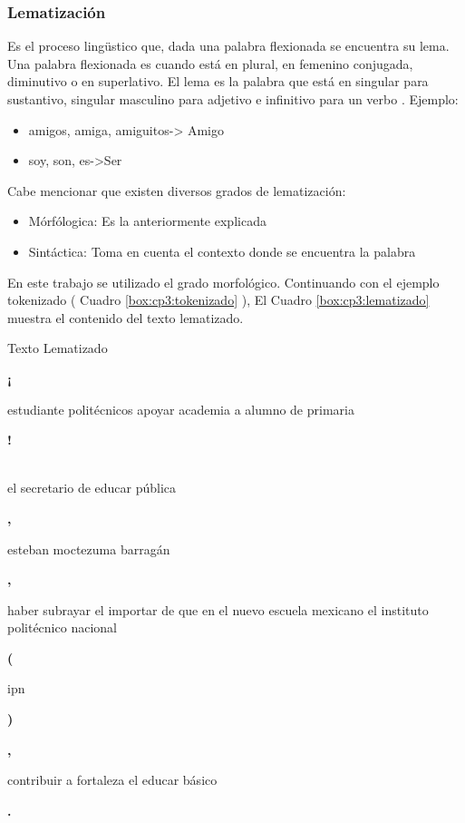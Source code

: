 
\subsubsection{Lematización}

Es el proceso lingüstico que, dada una palabra flexionada se encuentra su
lema. Una palabra flexionada es cuando está en plural, en femenino conjugada,
diminutivo o en superlativo. El lema es la palabra que está en singular para
sustantivo, singular masculino para adjetivo e infinitivo para un verbo \citep{CT13}. Ejemplo:

	\begin{itemize}
		\item amigos, amiga, amiguitos-> Amigo
		\item soy, son, es->Ser
	\end{itemize}

Cabe mencionar que existen diversos grados de lematización:

	\begin{itemize}
		\item Mórfólogica: Es la anteriormente explicada
		\item Sintáctica: Toma en cuenta el contexto donde se encuentra la palabra

	\end{itemize}

En este trabajo se utilizado el grado morfológico. Continuando con el ejemplo tokenizado ( Cuadro \ref{box:cp3:tokenizado} ), El Cuadro \ref{box:cp3:lematizado} muestra el contenido del texto lematizado.\\

\begin{mygraybox}[label={box:cp3:lematizado}]{Texto Lematizado} 
\begin{large}\textbf{¡}\end{large} estudiante politécnicos apoyar academia a alumno de primaria \begin{large}\textbf{!}\end{large}\\

el secretario de educar pública \begin{Large}\textbf{,}\end{Large} esteban moctezuma barragán \begin{Large}\textbf{,}\end{Large} haber subrayar el importar  de que en el nuevo escuela mexicano el instituto politécnico nacional \begin{Large}\textbf{(}\end{Large} ipn \begin{Large}\textbf{)}\end{Large} \begin{Large}\textbf{,}\end{Large} contribuir a fortaleza el educar básico \begin{Large}\textbf{.}\end{Large}
\end{mygraybox}
\ \\



